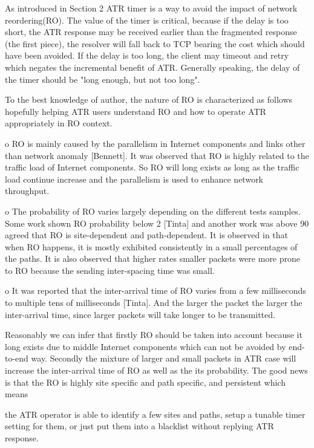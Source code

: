 
As introduced in Section 2 ATR timer is a way to avoid the impact of
network reordering(RO).  The value of the timer is critical, because
if the delay is too short, the ATR response may be received earlier
than the fragmented response (the first piece), the resolver will
fall back to TCP bearing the cost which should have been avoided.  If
the delay is too long, the client may timeout and retry which negates
the incremental benefit of ATR.  Generally speaking, the delay of the
timer should be "long enough, but not too long".

To the best knowledge of author, the nature of RO is characterized as
follows hopefully helping ATR users understand RO and how to operate
ATR appropriately in RO context.

o  RO is mainly caused by the parallelism in Internet components and
   links other than network anomaly [Bennett].  It was observed that
   RO is highly related to the traffic load of Internet components.
   So RO will long exists as long as the traffic load continue
   increase and the parallelism is used to enhance network
   throughput.

o  The probability of RO varies largely depending on the different
   tests samples.  Some work shown RO probability below 2%
   [Tinta] and another work was above 90%
   agreed that RO is site-dependent and path-dependent.  It is
   observed in that when RO happens, it is mostly exhibited
   consistently in a small percentages of the paths.  It is also
   observed that higher rates smaller packets were more prone to RO
   because the sending inter-spacing time was small.

o  It was reported that the inter-arrival time of RO varies from a
   few milliseconds to multiple tens of milliseconds [Tinta].  And
   the larger the packet the larger the inter-arrival time, since
   larger packets will take longer to be transmitted.

Reasonably we can infer that firstly RO should be taken into account
because it long exists due to middle Internet components which can
not be avoided by end-to-end way.  Secondly the mixture of larger and
small packets in ATR case will increase the inter-arrival time of RO
as well as the its probability.  The good news is that the RO is
highly site specific and path specific, and persistent which means

the ATR operator is able to identify a few sites and paths, setup a
tunable timer setting for them, or just put them into a blacklist
without replying ATR response.

